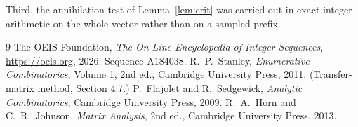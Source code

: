 \documentclass[11pt,a4paper]{article}
\theoremstyle{plain}
\theoremstyle{definition}
\begin{document}
Third, the annihilation test of Lemma~\ref{lem:crit} was carried out in exact integer
arithmetic on the whole vector rather than on a sampled prefix.

\begin{thebibliography}{9}
 The OEIS Foundation, \emph{The On-Line Encyclopedia of Integer
Sequences}, \url{https://oeis.org}, 2026. Sequence A184038.
 R.~P.~Stanley, \emph{Enumerative Combinatorics}, Volume 1, 2nd ed.,
Cambridge University Press, 2011. (Transfer-matrix method, Section 4.7.)
 P.~Flajolet and R.~Sedgewick, \emph{Analytic Combinatorics}, Cambridge
University Press, 2009.
 R.~A.~Horn and C.~R.~Johnson, \emph{Matrix Analysis}, 2nd ed., Cambridge
University Press, 2013.
\end{thebibliography}
\end{document}
